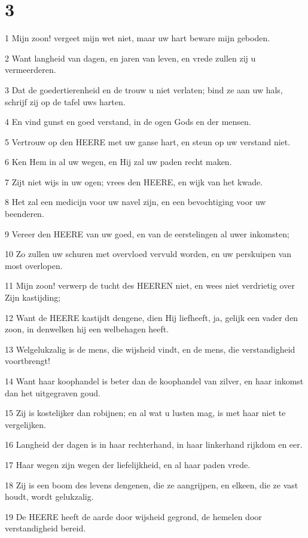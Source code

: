 \chapter{3}

\par 1 Mijn zoon! vergeet mijn wet niet, maar uw hart beware mijn geboden.
\par 2 Want langheid van dagen, en jaren van leven, en vrede zullen zij u vermeerderen.
\par 3 Dat de goedertierenheid en de trouw u niet verlaten; bind ze aan uw hals, schrijf zij op de tafel uws harten.
\par 4 En vind gunst en goed verstand, in de ogen Gods en der mensen.
\par 5 Vertrouw op den HEERE met uw ganse hart, en steun op uw verstand niet.
\par 6 Ken Hem in al uw wegen, en Hij zal uw paden recht maken.
\par 7 Zijt niet wijs in uw ogen; vrees den HEERE, en wijk van het kwade.
\par 8 Het zal een medicijn voor uw navel zijn, en een bevochtiging voor uw beenderen.
\par 9 Vereer den HEERE van uw goed, en van de eerstelingen al uwer inkomsten;
\par 10 Zo zullen uw schuren met overvloed vervuld worden, en uw perskuipen van most overlopen.
\par 11 Mijn zoon! verwerp de tucht des HEEREN niet, en wees niet verdrietig over Zijn kastijding;
\par 12 Want de HEERE kastijdt dengene, dien Hij liefheeft, ja, gelijk een vader den zoon, in denwelken hij een welbehagen heeft.
\par 13 Welgelukzalig is de mens, die wijsheid vindt, en de mens, die verstandigheid voortbrengt!
\par 14 Want haar koophandel is beter dan de koophandel van zilver, en haar inkomst dan het uitgegraven goud.
\par 15 Zij is kostelijker dan robijnen; en al wat u lusten mag, is met haar niet te vergelijken.
\par 16 Langheid der dagen is in haar rechterhand, in haar linkerhand rijkdom en eer.
\par 17 Haar wegen zijn wegen der liefelijkheid, en al haar paden vrede.
\par 18 Zij is een boom des levens dengenen, die ze aangrijpen, en elkeen, die ze vast houdt, wordt gelukzalig.
\par 19 De HEERE heeft de aarde door wijsheid gegrond, de hemelen door verstandigheid bereid.

